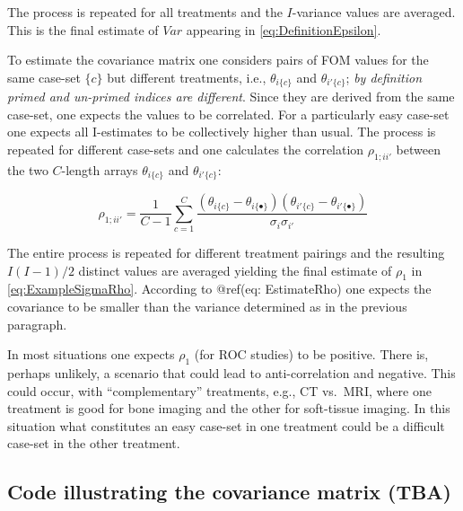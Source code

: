 \documentclass[
]{book}
\begin{document}
The process is repeated for all treatments and the \(I\)-variance values are averaged. This is the final estimate of \(Var\) appearing in \eqref{eq:DefinitionEpsilon}.

To estimate the covariance matrix one considers pairs of FOM values for the same case-set \(\{c\}\) but different treatments, i.e., \(\theta_{i\{c\}}\) and \(\theta_{i'\{c\}}\); \emph{by definition primed and un-primed indices are different}. Since they are derived from the same case-set, one expects the values to be correlated. For a particularly easy case-set one expects all I-estimates to be collectively higher than usual. The process is repeated for different case-sets and one calculates the correlation \(\rho_{1;ii'}\) between the two \(C\)-length arrays \(\theta_{i\{c\}}\) and \(\theta_{i'\{c\}}\):

\begin{equation}
\rho_{1;ii'} = \frac{1}{C-1}\sum_{c=1}^{C} \frac {\left ( \theta_{i\{c\}} - \theta_{i\{\bullet\}} \right) \left ( \theta_{i'\{c\}} - \theta_{i'\{\bullet\}} \right)}{\sigma_i \sigma_{i'} }
\label{eq:EstimateRho}
\end{equation}

The entire process is repeated for different treatment pairings and the resulting \(I(I-1)/2\) distinct values are averaged yielding the final estimate of \(\rho_1\) in \eqref{eq:ExampleSigmaRho}. According to @ref(eq: EstimateRho) one expects the covariance to be smaller than the variance determined as in the previous paragraph.

In most situations one expects \(\rho_1\) (for ROC studies) to be positive. There is, perhaps unlikely, a scenario that could lead to anti-correlation and negative. This could occur, with ``complementary'' treatments, e.g., CT vs.~MRI, where one treatment is good for bone imaging and the other for soft-tissue imaging. In this situation what constitutes an easy case-set in one treatment could be a difficult case-set in the other treatment.

\hypertarget{code-illustrating-the-covariance-matrix-tba}{%
\subsection{Code illustrating the covariance matrix (TBA)}\label{code-illustrating-the-covariance-matrix-tba}}
\end{document}

